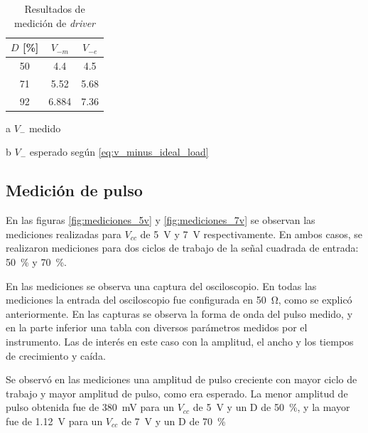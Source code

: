 \begin{table}[t!]
    \centering
    \begin{threeparttable}[b]
        \begin{tabular}{ccc}
        \hline
            $D$ [\unit{\percent}] & $V_{-m}$ \tnote{a} & $V_{-e}$ \tnote{b} \\
        \hline
            50 & 4.4 & 4.5 \\
            71 & 5.52 & 5.68 \\
            92 & 6.884 & 7.36  \\
        \hline
    \end{tabular}
    \begin{tablenotes}
        \item [a] $V_-$ medido
        \item [b] $V_-$ esperado según \ref{eq:v_minus_ideal_load}
    \end{tablenotes}
    \end{threeparttable}
    \caption{Resultados de medición de \textit{driver}}
    \label{tab:mediciones_driver_resultados}
\end{table}

\subsection{Medición de pulso}

En las figuras \ref{fig:mediciones_5v} y \ref{fig:mediciones_7v} se observan las
mediciones realizadas para $V_{cc}$ de \qty{5}{\volt} y \qty{7}{\volt}
respectivamente. En ambos casos, se realizaron mediciones para dos ciclos de
trabajo de la señal cuadrada de entrada: \qty{50}{\percent} y
\qty{70}{\percent}.

En las mediciones se observa una captura del osciloscopio. En todas las
mediciones la entrada del osciloscopio fue configurada en \qty{50}{\ohm}, como
se explicó anteriormente. En las capturas se observa la forma de onda del
pulso medido, y en la parte inferior una tabla con diversos parámetros
medidos por el instrumento. Las de interés en este caso con la amplitud, el
ancho y los tiempos de crecimiento y caída.

Se observó en las mediciones una amplitud de pulso creciente con mayor ciclo de
trabajo y mayor amplitud de pulso, como era esperado. La menor amplitud de pulso
obtenida fue de \qty{380}{\milli\volt} para un $V_{cc}$ de \qty{5}{\volt} y un D
de \qty{50}{\percent}, y la mayor fue de \qty{1.12}{\volt} para un $V_{cc}$
de \qty{7}{\volt} y un D de \qty{70}{\percent}

